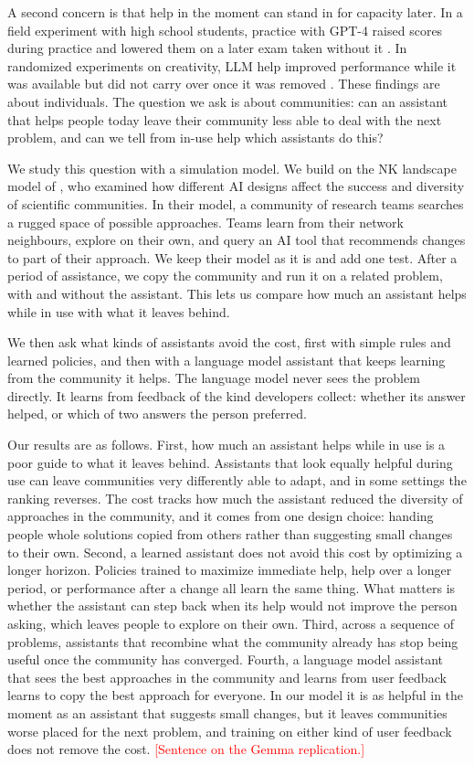 \documentclass[11pt]{article}
\newcommand{\pending}[1]{\textcolor{red}{[#1]}}
\begin{document}
A second concern is that help in the moment can stand in for capacity later. In a field experiment with high school students, practice with GPT-4 raised scores during practice and lowered them on a later exam taken without it \citep{bastani2025generative}. In randomized experiments on creativity, LLM help improved performance while it was available but did not carry over once it was removed \citep{kumar2025human}. These findings are about individuals. The question we ask is about communities: can an assistant that helps people today leave their community less able to deal with the next problem, and can we tell from in-use help which assistants do this?

We study this question with a simulation model. We build on the NK landscape model of \citet{fazelpour2026navigating}, who examined how different AI designs affect the success and diversity of scientific communities. In their model, a community of research teams searches a rugged space of possible approaches. Teams learn from their network neighbours, explore on their own, and query an AI tool that recommends changes to part of their approach. We keep their model as it is and add one test. After a period of assistance, we copy the community and run it on a related problem, with and without the assistant. This lets us compare how much an assistant helps while in use with what it leaves behind.

We then ask what kinds of assistants avoid the cost, first with simple rules and learned policies, and then with a language model assistant that keeps learning from the community it helps. The language model never sees the problem directly. It learns from feedback of the kind developers collect: whether its answer helped, or which of two answers the person preferred.

Our results are as follows. First, how much an assistant helps while in use is a poor guide to what it leaves behind. Assistants that look equally helpful during use can leave communities very differently able to adapt, and in some settings the ranking reverses. The cost tracks how much the assistant reduced the diversity of approaches in the community, and it comes from one design choice: handing people whole solutions copied from others rather than suggesting small changes to their own. Second, a learned assistant does not avoid this cost by optimizing a longer horizon. Policies trained to maximize immediate help, help over a longer period, or performance after a change all learn the same thing. What matters is whether the assistant can step back when its help would not improve the person asking, which leaves people to explore on their own. Third, across a sequence of problems, assistants that recombine what the community already has stop being useful once the community has converged. Fourth, a language model assistant that sees the best approaches in the community and learns from user feedback learns to copy the best approach for everyone. In our model it is as helpful in the moment as an assistant that suggests small changes, but it leaves communities worse placed for the next problem, and training on either kind of user feedback does not remove the cost. \pending{Sentence on the Gemma replication.}
\end{document}
